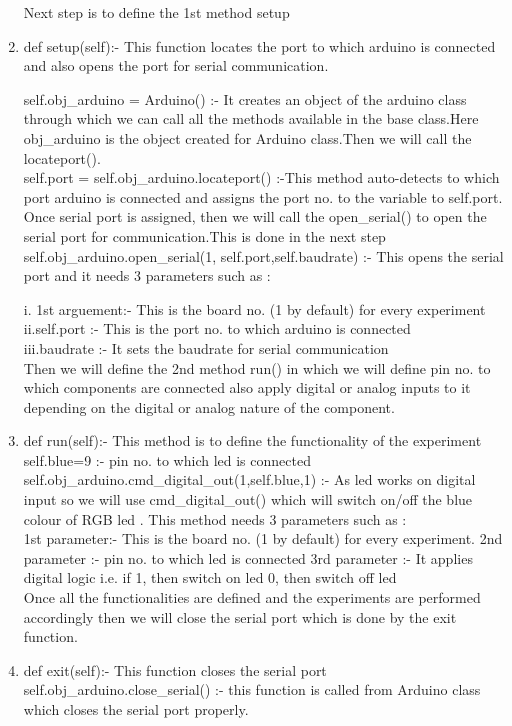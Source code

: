 \begin{enumerate}
   Next step is to define the 1st method setup \\
\item def setup(self):- This function locates the port to which arduino is connected and 
also opens the port for serial communication.

  self.obj\_arduino = Arduino() :- It creates an object of the arduino class
  through which we can call all the methods available in the base class.Here 
  obj\_arduino is the object created for Arduino class.Then we will call the locateport().\\
  self.port = self.obj\_arduino.locateport() :-This method auto-detects to which port 
  arduino is connected and assigns the port no. to the variable to self.port. Once 
  serial port is assigned, then we will call the open\_serial() to open the serial 
  port for communication.This is done in the next step \\
  self.obj\_arduino.open\_serial(1, self.port,self.baudrate) :- This opens the 
  serial port and it needs 3 parameters such as :

            i. 1st arguement:- This is the board no. (1 by default) for every experiment \\
            ii.self.port :- This is the port no. to which arduino is connected \\
            iii.baudrate :- It sets the baudrate for serial communication \\

Then we will define the 2nd method run() in which we will define pin no. to which components are connected also apply digital or analog inputs to it depending on the digital or analog nature of the component.

\item def run(self):- This method is to define the functionality of the experiment \\
self.blue=9 :- pin no. to which led is connected \\
self.obj\_arduino.cmd\_digital\_out(1,self.blue,1) :- As led works on digital input so we will use cmd\_digital\_out() which will switch on/off the blue colour of RGB led .
This method needs 3 parameters such as : \\
1st parameter:- This is the board no. (1 by default) for every experiment.
2nd parameter :- pin no. to which led is connected
3rd parameter :- It applies digital logic i.e. if 1, then switch on led 
                                                  0, then switch off led \\
  Once all the functionalities are defined and the experiments are performed accordingly then we will close the serial port which  is done by the exit function.
\item def exit(self):- This function closes the serial port \\
        self.obj\_arduino.close\_serial() :- this function is called from Arduino class which closes the serial port properly.


\end{enumerate}
